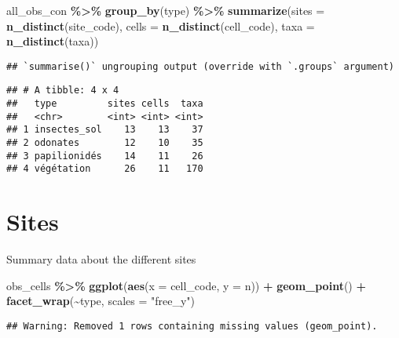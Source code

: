 \documentclass[
]{book}
\newenvironment{Shaded}{\begin{snugshade}}{\end{snugshade}}
\newcommand{\DataTypeTok}[1]{\textcolor[rgb]{0.13,0.29,0.53}{#1}}
\newcommand{\KeywordTok}[1]{\textcolor[rgb]{0.13,0.29,0.53}{\textbf{#1}}}
\newcommand{\NormalTok}[1]{#1}
\newcommand{\OperatorTok}[1]{\textcolor[rgb]{0.81,0.36,0.00}{\textbf{#1}}}
\newcommand{\StringTok}[1]{\textcolor[rgb]{0.31,0.60,0.02}{#1}}
\begin{document}
\begin{Shaded}
\begin{Highlighting}[]
\NormalTok{all\_obs\_con }\OperatorTok{\%\textgreater{}\%}\StringTok{ }
\StringTok{  }\KeywordTok{group\_by}\NormalTok{(type) }\OperatorTok{\%\textgreater{}\%}\StringTok{ }
\StringTok{  }\KeywordTok{summarize}\NormalTok{(}\DataTypeTok{sites =} \KeywordTok{n\_distinct}\NormalTok{(site\_code),}
            \DataTypeTok{cells =} \KeywordTok{n\_distinct}\NormalTok{(cell\_code),}
            \DataTypeTok{taxa =} \KeywordTok{n\_distinct}\NormalTok{(taxa))}
\end{Highlighting}
\end{Shaded}

\begin{verbatim}
## `summarise()` ungrouping output (override with `.groups` argument)
\end{verbatim}

\begin{verbatim}
## # A tibble: 4 x 4
##   type         sites cells  taxa
##   <chr>        <int> <int> <int>
## 1 insectes_sol    13    13    37
## 2 odonates        12    10    35
## 3 papilionidés    14    11    26
## 4 végétation      26    11   170
\end{verbatim}

\hypertarget{sites}{%
\chapter{Sites}\label{sites}}

Summary data about the different sites

\begin{Shaded}
\begin{Highlighting}[]
\NormalTok{obs\_cells }\OperatorTok{\%\textgreater{}\%}\StringTok{ }
\StringTok{  }\KeywordTok{ggplot}\NormalTok{(}\KeywordTok{aes}\NormalTok{(}\DataTypeTok{x =}\NormalTok{ cell\_code, }\DataTypeTok{y =}\NormalTok{ n)) }\OperatorTok{+}\StringTok{ }\KeywordTok{geom\_point}\NormalTok{() }\OperatorTok{+}\StringTok{ }
\StringTok{  }\KeywordTok{facet\_wrap}\NormalTok{(}\OperatorTok{\textasciitilde{}}\NormalTok{type, }\DataTypeTok{scales =} \StringTok{"free\_y"}\NormalTok{)}
\end{Highlighting}
\end{Shaded}

\begin{verbatim}
## Warning: Removed 1 rows containing missing values (geom_point).
\end{verbatim}
\end{document}
